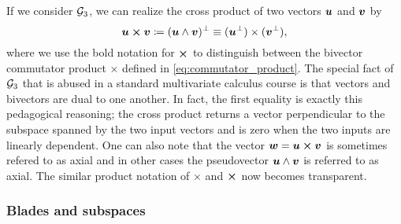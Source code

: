 \begin{remark}
\label{rem:cross_product}
If we consider $\mathcal{G}_3$, we can realize the cross product of two vectors $\boldsymbol{u}$ and $\boldsymbol{v}$ by
\begin{equation}
\boldsymbol{u} \boldsymbol{\times} \boldsymbol{v} \coloneqq (\boldsymbol{u}\wedge \boldsymbol{v})^\perp
\equiv (\boldsymbol{u}^\perp)\times (\boldsymbol{v}^\perp), 
\end{equation}
where we use the bold notation for $\boldsymbol{\times}$ to distinguish between the bivector commutator product $\times$ defined in \cref{eq:commutator_product}. The special fact of $\mathcal{G}_3$ that is abused in a standard multivariate calculus course is that vectors and bivectors are dual to one another. In fact, the first equality is exactly this pedagogical reasoning; the cross product returns a vector perpendicular to the subspace spanned by the two input vectors and is zero when the two inputs are linearly dependent. One can also note that the vector $\boldsymbol{w}=\boldsymbol{u}\boldsymbol{\times} \boldsymbol{v}$ is sometimes refered to as axial and in other cases the pseudovector $\boldsymbol{u}\wedge \boldsymbol{v}$ is referred to as axial. The similar product notation of $\times$ and $\boldsymbol{\times}$ now becomes transparent. 
\end{remark}


\subsubsection{Blades and subspaces}
\label{subsubsec:blades_and_subspaces}

